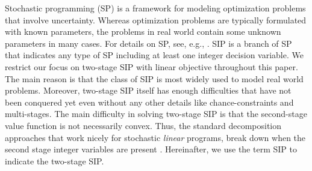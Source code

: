 Stochastic programming (SP) is a framework for modeling optimization problems that involve uncertainty. Whereas optimization problems are typically formulated with known parameters, the problems in real world contain some unknown parameters in many cases. For details on SP, see, e.g., \cite{web:SPS,book:BL2011}. SIP is a branch of SP that indicates any type of SP including at least one integer decision variable. We restrict our focus on two-stage SIP with linear objective throughout this paper. The main reason is that the class of SIP is most widely used to model real world problems. Moreover, two-stage SIP itself has enough difficulties that have not been conquered yet even without any other details like chance-constraints and multi-stages. The main difficulty in solving two-stage SIP is that the second-stage value function is not necessarily convex. Thus, the standard decomposition approaches that work nicely for stochastic \textit{linear} programs, break down when the second stage integer variables are present \cite{journal:AG2004}. Hereinafter, we use the term SIP to indicate the two-stage SIP. 







